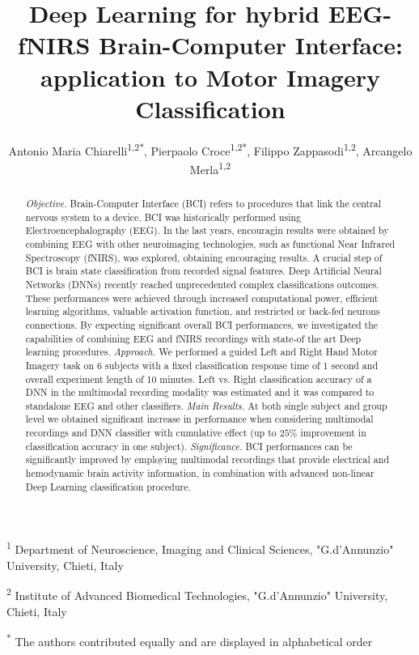 \documentclass[12pt ]{iopart}
\begin{document}
\title[DNN for EEG-fNIRS BCI]{Deep Learning for  hybrid EEG-fNIRS Brain-Computer Interface: application to Motor Imagery Classification}

\author{Antonio Maria Chiarelli\textsuperscript{1,2*}, Pierpaolo Croce\textsuperscript{1,2*}, Filippo Zappasodi\textsuperscript{1,2}, Arcangelo Merla\textsuperscript{1,2}}

\vspace{10pt}
\begin{indented}
\item[] \textsuperscript{1} Department of Neuroscience, Imaging and Clinical Sciences, "G.d’Annunzio" University, Chieti, Italy
\item[] \textsuperscript{2} Institute of Advanced Biomedical Technologies, "G.d’Annunzio" University, Chieti, Italy
\item[] \textsuperscript{*} The authors contributed equally and are displayed in alphabetical order
\end{indented}

\begin{abstract}
	\textit{Objective.} Brain-Computer Interface (BCI) refers to procedures that link the central nervous system to a device.  BCI was historically performed using Electroencephalography (EEG). In the last years, encouragin results were obtained by combining EEG with other neuroimaging technologies, such as functional Near Infrared Spectroscopy (fNIRS), was explored, obtaining encouraging results. A crucial step of BCI is brain state classification from recorded signal features. Deep Artificial Neural Networks (DNNs) recently reached unprecedented complex classifications outcomes. These performances were achieved through increased computational power, efficient learning algorithms, valuable activation function, and restricted or back-fed neurons connections. By expecting significant overall BCI performances, we investigated the capabilities of combining EEG and fNIRS recordings with state-of the art Deep learning procedures.
	\textit{Approach.} We performed a guided Left and Right Hand Motor Imagery task on 6 subjects with a fixed classification response time of 1 second and overall experiment length of 10 minutes. Left vs. Right classification accuracy of a DNN in the multimodal recording modality was estimated and it was compared to standalone EEG and other classifiers.
	\textit{Main Results.} At both single subject and group level we obtained significant increase in performance when considering multimodal recordings and DNN classifier with cumulative effect (up to $25\%$ improvement in classification accuracy in one subject).
	\textit{Significance.} BCI performances can be significantly improved by employing multimodal recordings that provide electrical and hemodynamic brain activity information, in combination with advanced non-linear Deep Learning classification procedure.
\end{abstract}
\end{document}
